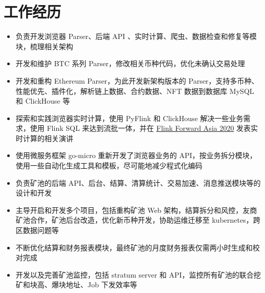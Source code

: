 \documentclass{resume}
\begin{document}
\pagestyle{empty}

\section{工作经历}
\begin{onehalfspacing}
\begin{itemize}
  \item 负责开发浏览器 Parser、后端 API 、实时计算、爬虫、数据检查和修复等模块，梳理相关架构
  \item 开发和维护 BTC 系列 Parser，修改相关币种代码，优化未确认交易处理
  \item 开发和重构 Ethereum Parser，为此开发新架构版本的 Parser，支持多币种、性能优先、插件化，解析链上数据、合约数据、NFT 数据到数据库 MySQL 和 ClickHouse 等
  \item 探索和实践浏览器实时计算，使用 PyFlink 和 ClickHouse 解决一些业务需求，使用 Flink SQL 来达到流批一体，并在 \href{https://2020.flink-forward.org.cn/}{Flink Forward Asia 2020} 发表实时计算的相关演讲
  \item 使用微服务框架 go-micro 重新开发了浏览器业务的 API，按业务拆分模块，使用一些自动化生成工具和模板，尽可能地减少程式化编码
\end{itemize}
\begin{itemize}
  \item 负责矿池的后端 API、后台、结算、清算统计、交易加速、消息推送模块等的设计和开发
  \item 主导开启和开发多个项目，包括重构矿池 Web 架构，结算拆分和风控，友商矿池合作，矿池后台改造，优化新币种开发，协助运维迁移至 kubernetes，跨区数据问题等
  \item 不断优化结算和财务报表模块，最终矿池的月度财务报表仅需两小时生成和校对完成
  \item 开发以及完善矿池监控，包括 stratum server 和 API，监控所有矿池的联合挖矿和块高、爆块地址、Job 下发效率等
\end{itemize}
\end{onehalfspacing}
\end{document}
